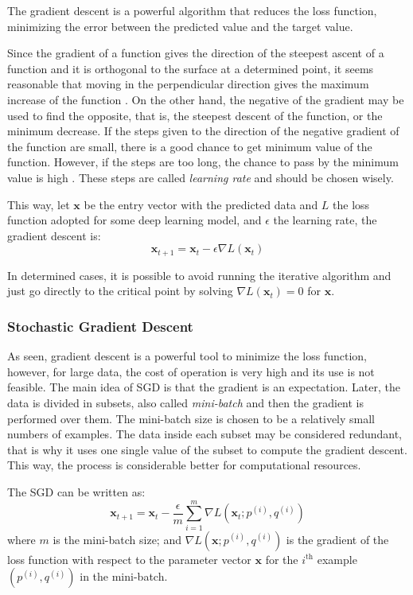 The gradient descent is a powerful algorithm that reduces the loss function, minimizing the error between the predicted value and the target value.

Since the gradient of a function gives the direction of the steepest ascent of a function and it is orthogonal to the surface at a determined point, it seems reasonable that moving in the perpendicular direction gives the maximum increase of the function \cite{stewart2016}.
On the other hand, the negative of the gradient may be used to find the opposite, that is, the steepest descent of the function, or the minimum decrease.
If the steps given to the direction of the negative gradient of the function are small, there is a good chance to get minimum value of the function.
However, if the steps are too long, the chance to pass by the minimum value is high \cite{nielsen2015}.
These steps are called \emph{learning rate} and should be chosen wisely.

This way, let \(\mathbf{x}\) be the entry vector with the predicted data and \(L\) the loss function adopted for some deep learning model, and \(\epsilon\) the learning rate, the gradient descent is:
%
\begin{equation}
    \mathbf{x}_{t+1} = \mathbf{x}_t - \epsilon \nabla L(\mathbf{x}_t)
\end{equation}

In determined cases, it is possible to avoid running the iterative algorithm and just go directly to the critical point by solving \(\nabla L(\mathbf{x}_t) = 0\) for \(\mathbf{x}\).

\subsubsection*{Stochastic Gradient Descent}

As seen, gradient descent is a powerful tool to minimize the loss function, however, for large data, the cost of operation is very high and its use is not feasible. 
The main idea of SGD is that the gradient is an expectation.
Later, the data is divided in subsets, also called \emph{mini-batch} and then the gradient is performed over them.
The mini-batch size is chosen to be a relatively small numbers of examples.
The data inside each subset may be considered redundant, that is why it uses one single value of the subset to compute the gradient descent.
This way, the process is considerable better for computational resources.

The SGD can be written as:
%
\begin{equation}
    \mathbf{x}_{t+1} = \mathbf{x}_t - \frac{\epsilon}{m} \sum_{i=1}^m \nabla L(\mathbf{x}_t; p^{(i)},q^{(i)})
\end{equation}
%
where \(m\)  is the mini-batch size; and \(\nabla L(\mathbf{x}; p^{(i)}, q^{(i)})\) is the gradient of the loss function with respect to the parameter vector \(\mathbf{x}\) for the \(i^{\text{th}}\) example \((p^{(i)}, q^{(i)})\) in the mini-batch.

